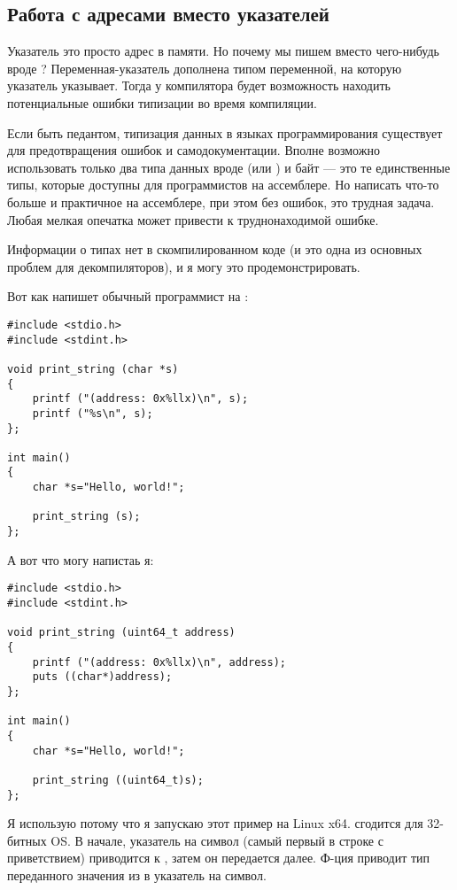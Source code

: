\subsection{Работа с адресами вместо указателей}

Указатель это просто адрес в памяти. Но почему мы пишем  вместо чего-нибудь вроде ?
Переменная-указатель дополнена типом переменной, на которую указатель указывает.
Тогда у компилятора будет возможность находить потенциальные ошибки типизации во время компиляции.

Если быть педантом, типизация данных в языках программирования существует для предотвращения ошибок и самодокументации.
Вполне возможно использовать только два типа данных вроде  (или ) и байт --- это те единственные типы, которые
доступны для программистов на ассемблере.
Но написать что-то больше и практичное на ассемблере, при этом без ошибок, это трудная задача.
Любая мелкая опечатка может привести к труднонаходимой ошибке.

Информации о типах нет в скомпилированном коде (и это одна из основных проблем для декомпиляторов),
и я могу это продемонстрировать.

Вот как напишет обычный программист на \CCpp{}:

\begin{lstlisting}[style=customc]
#include <stdio.h>
#include <stdint.h>

void print_string (char *s)
{
	printf ("(address: 0x%llx)\n", s);
	printf ("%s\n", s);
};

int main()
{
	char *s="Hello, world!";

	print_string (s);
};
\end{lstlisting}

А вот что могу напистаь я:

\begin{lstlisting}[style=customc]
#include <stdio.h>
#include <stdint.h>

void print_string (uint64_t address)
{
	printf ("(address: 0x%llx)\n", address);
	puts ((char*)address);
};

int main()
{
	char *s="Hello, world!";

	print_string ((uint64_t)s);
};
\end{lstlisting}

Я использую  потому что я запускаю этот пример на Linux x64.  сгодится для 32-битных \ac{OS}.
В начале, указатель на символ (самый первый в строке с приветствием) приводится к , затем он передается далее.
Ф-ция  приводит тип переданного значения из  в указатель на символ.

